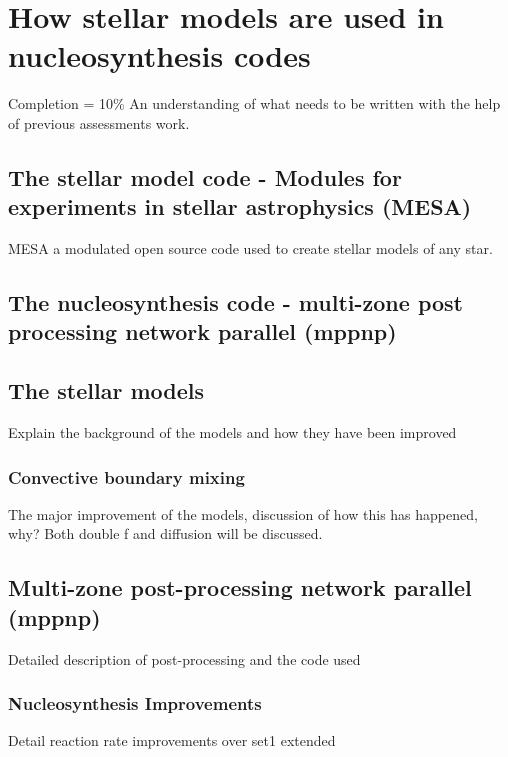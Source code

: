 \chapter{How stellar models are used in nucleosynthesis codes}

Completion = 10\%
An understanding of what needs to be written with the help of previous assessments work.

\section{The stellar model code - Modules for experiments in stellar astrophysics (MESA)}

MESA a modulated open source code used to create stellar models of any star.

\section{The nucleosynthesis code - multi-zone post processing network parallel (mppnp)}

\section{The stellar models}

Explain the background of the models and how they have been improved

\subsection{Convective boundary mixing}

The major improvement of the models, discussion of how this has happened, why? Both double f and diffusion will be discussed.

\section{Multi-zone post-processing network parallel (mppnp)}

Detailed description of post-processing and the code used

\subsection{Nucleosynthesis Improvements}

Detail reaction rate improvements over set1 extended

